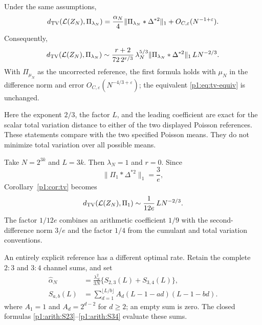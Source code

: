 \begin{corollary}
\label{p1:cor:tv}
Under the same assumptions,
\begin{equation}
 d_{\mathrm{TV}}(\mathcal L(Z_N),\Pi_{\lambda_N})
   =\frac{\alpha_N}{4}
       \|\Pi_{\lambda_N}*\Delta^{*2}\|_1
       +O_{C,\varepsilon}(N^{-1+\varepsilon}).
 \label{p1:eq:tv-main}
\end{equation}
Consequently,
\begin{equation}
 d_{\mathrm{TV}}(\mathcal L(Z_N),\Pi_{\lambda_N})
 \sim
 \frac{r+2}{72\,2^{r/3}}\,
 \lambda_N^{5/3}
 \|\Pi_{\lambda_N}*\Delta^{*2}\|_1\,
 L N^{-2/3}.
 \label{p1:eq:tv-equiv}
\end{equation}
With \(\Pi_{\mu_N}\) as the uncorrected reference, the
first formula holds with \(\mu_N\) in the difference norm
and error \(O_{C,\varepsilon}(N^{-4/3+\varepsilon})\);
the equivalent \eqref{p1:eq:tv-equiv} is unchanged.
\end{corollary}

Here the exponent \(2/3\), the factor \(L\), and the leading
coefficient are exact for the scalar total variation distance
to either of the two displayed Poisson references.
These statements compare with the two specified Poisson means.
They do not minimize total variation over all possible means.

\begin{example}
\label{p1:ex:unit}
Take \(N=2^{3k}\) and \(L=3k\). Then \(\lambda_N=1\) and
\(r=0\). Since
\[
 \|\Pi_1*\Delta^{*2}\|_1=\frac3e,
\]
Corollary~\ref{p1:cor:tv} becomes
\begin{equation}
 d_{\mathrm{TV}}(\mathcal L(Z_N),\Pi_1)
       \sim \frac{1}{12e}\,L N^{-2/3}.
 \label{p1:eq:unit-example}
\end{equation}
The factor \(1/12e\) combines an arithmetic coefficient \(1/9\)
with the second-difference norm \(3/e\) and the factor \(1/4\)
from the cumulant and total variation conventions.
\end{example}

An entirely explicit reference has a different optimal rate.
Retain the complete \(2:3\) and \(3:4\) channel sums, and set
\begin{equation}
 \begin{aligned}
 \widehat\alpha_N
   &=\frac{\lambda_N^2}{3N}\{S_{2,3}(L)+S_{3,4}(L)\},\\
 S_{a,b}(L)
   &=\sum_{d=1}^{\lfloor L/b\rfloor}A_d(L-1-ad)(L-1-bd).
 \end{aligned}
 \label{p1:eq:alpha-explicit}
\end{equation}
where \(A_1=1\) and \(A_d=2^{d-2}\) for \(d\ge2\); an empty
sum is zero. The closed formulas
\eqref{p1:arith:S23}--\eqref{p1:arith:S34} evaluate these sums.

